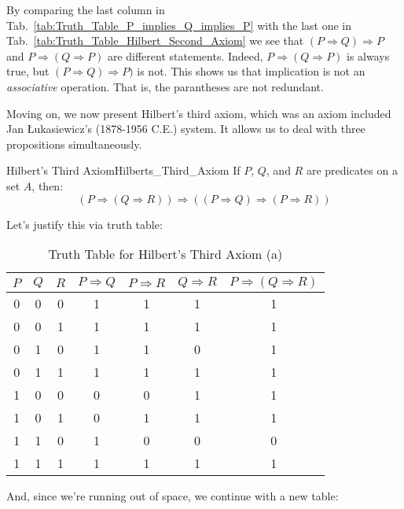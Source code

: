     By comparing the last column in
    Tab.~\ref{tab:Truth_Table_P_implies_Q_implies_P} with the last one in
    Tab.~\ref{tab:Truth_Table_Hilbert_Second_Axiom} we see that
    $(P\Rightarrow{Q})\Rightarrow{P}$ and $P\Rightarrow(Q\Rightarrow{P})$ are
    different statements. Indeed, $P\Rightarrow(Q\Rightarrow{P})$ is always
    true, but $(P\Rightarrow{Q})\Rightarrow{P})$ is not. This shows us that
    implication is not an \textit{associative}
    operation. That is, the parantheses are not redundant.
    \par\hfill\par
    Moving on, we now present Hilbert's third axiom, which was an axiom included
    Jan \L{u}kasiewicz's (1878-1956 C.E.) system. It
    allows us to deal with three propositions simultaneously.
    \begin{faxiom}{Hilbert's Third Axiom}{Hilberts_Third_Axiom}
        \label{thm:Lukasiewicz_Second_Axiom}%
        If $P$, $Q$, and $R$ are predicates on a set $A$, then:%
        \begin{equation*}
            (P\Rightarrow(Q\Rightarrow{R}))\Rightarrow
            ((P\Rightarrow{Q})\Rightarrow(P\Rightarrow{R}))
        \end{equation*}
    \end{faxiom}
    Let's justify this via truth table:
    \begin{table}[H]
        \centering
        \captionsetup{type=table}
        \begin{tabular}{c|c|c|c|c|c|c}
            $P$&$Q$&$R$&$P\Rightarrow{Q}$&$P\Rightarrow{R}$&$Q\Rightarrow{R}$
                &$P\Rightarrow(Q\Rightarrow{R})$\\
            \hline
            0&0&0&1&1&1&1\\
            0&0&1&1&1&1&1\\
            0&1&0&1&1&0&1\\
            0&1&1&1&1&1&1\\
            1&0&0&0&0&1&1\\
            1&0&1&0&1&1&1\\
            1&1&0&1&0&0&0\\
            1&1&1&1&1&1&1
        \end{tabular}
        \caption{Truth Table for Hilbert's Third Axiom (a)}
        \label{tab:Truth_Table_for_Hilberts_Third_a}
    \end{table}
    And, since we're running out of space, we continue with a new table:
